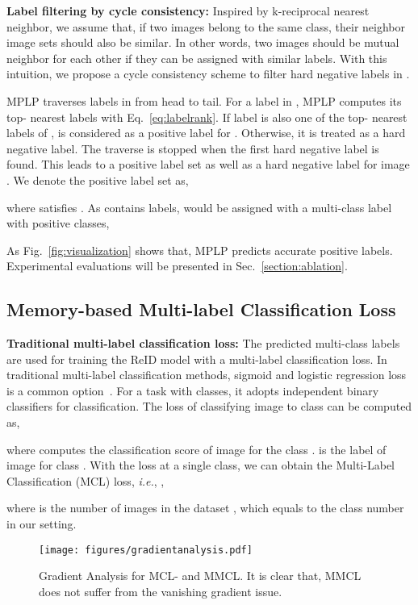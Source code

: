 \documentclass[10pt,twocolumn,letterpaper]{article}
\begin{document}
\textbf{Label filtering by cycle consistency:} Inspired by k-reciprocal nearest neighbor\cite{jegou2007contextual,zhong2017re}, we assume that, if two images belong to the same class, their neighbor image sets should also be similar. In other words, two images should be mutual neighbor for each other if they can be assigned with similar labels. With this intuition, we propose a cycle consistency scheme to filter hard negative labels in .

MPLP traverses labels in  from head to tail. For a label  in , MPLP computes its top- nearest labels with Eq.~\eqref{eq:labelrank}. If label  is also one of the top- nearest labels of ,  is considered as a positive label for . Otherwise, it is treated as a hard negative label. The traverse is stopped when the first hard negative label is found. This leads to a positive label set  as well as a hard negative label for image . We denote the positive label set as,

where  satisfies . As  contains  labels,  would be assigned with a multi-class label  with  positive classes,



As Fig.~\ref{fig:visualization} shows that, MPLP predicts accurate positive labels. Experimental evaluations will be presented in Sec.~\ref{section:ablation}.

\subsection{Memory-based Multi-label Classification Loss}\label{section:mmcl}
\textbf{Traditional multi-label classification loss:} The predicted multi-class labels are used for training the ReID model with a multi-label classification loss. In traditional multi-label classification methods, sigmoid and logistic regression loss is a common option~\cite{zhang2013review,Durand_2019_CVPR,wang2018transferable,lin2018multi}. For a task with  classes, it adopts  independent binary classifiers for classification. The loss of classifying image  to class  can be computed as,

where  computes the classification score of image  for the class .  is the label of image  for class . With the loss at a single class, we can obtain the Multi-Label Classification (MCL) loss, \emph{i.e.}, ,

where  is the number of images in the dataset , which equals to the class number in our setting.

\begin{figure}
\begin{center}
\texttt{[image: figures/gradientanalysis.pdf]}
\end{center}
   \caption{Gradient Analysis for MCL- and MMCL. It is clear that, MMCL does not suffer from the vanishing gradient issue.}
   \vspace{-2mm}
\label{fig:gradientanalysis}
\end{figure}
\end{document}
